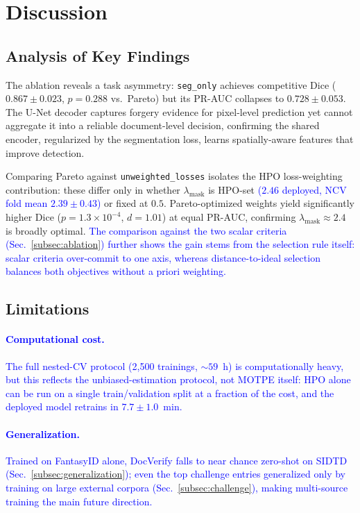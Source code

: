 \documentclass[final,5p,times,twocolumn,number]{elsarticle}
\newcommand{\rev}[1]{\textcolor{blue}{#1}}
\begin{document}
\section{Discussion}
\label{sec:discussion}

\subsection{Analysis of Key Findings}

The ablation reveals a task asymmetry: \texttt{seg\_only} achieves competitive
Dice ($0.867 \pm 0.023$, $p = 0.288$ vs.\ Pareto) but its PR-AUC collapses to
$0.728 \pm 0.053$. The U-Net decoder captures forgery evidence for pixel-level
prediction yet cannot aggregate it into a reliable document-level decision,
confirming the shared encoder, regularized by the segmentation loss, learns
spatially-aware features that improve detection.

Comparing Pareto against \texttt{unweighted\_losses} isolates the HPO
loss-weighting contribution: these differ only in whether $\lambda_{\text{mask}}$
is HPO-set \rev{($2.46$ deployed, NCV fold mean $2.39 \pm 0.43$)} or fixed at
$0.5$. Pareto-optimized weights yield significantly higher Dice ($p =
1.3 \times 10^{-4}$, $d = 1.01$) at equal PR-AUC, confirming
$\lambda_{\text{mask}} \approx 2.4$ is broadly optimal. \rev{The comparison
against the two scalar criteria (Sec.~\ref{subsec:ablation}) further shows the
gain stems from the selection rule itself: scalar criteria over-commit to one
axis, whereas distance-to-ideal selection balances both objectives without a
priori weighting.}

\subsection{Limitations}

\paragraph{\rev{Computational cost.}}
\rev{The full nested-CV protocol (2{,}500 trainings, ${\sim}59$~h) is computationally
heavy, but this reflects the unbiased-estimation protocol, not MOTPE itself:
HPO alone can be run on a single train/validation split at a fraction of the
cost, and the deployed model retrains in $7.7 \pm 1.0$~min.}

\paragraph{\rev{Generalization.}}
\rev{Trained on FantasyID alone, DocVerify falls to near chance zero-shot on SIDTD
(Sec.~\ref{subsec:generalization}); even the top challenge entries generalized
only by training on large external corpora (Sec.~\ref{subsec:challenge}), making
multi-source training the main future direction.}
\end{document}
